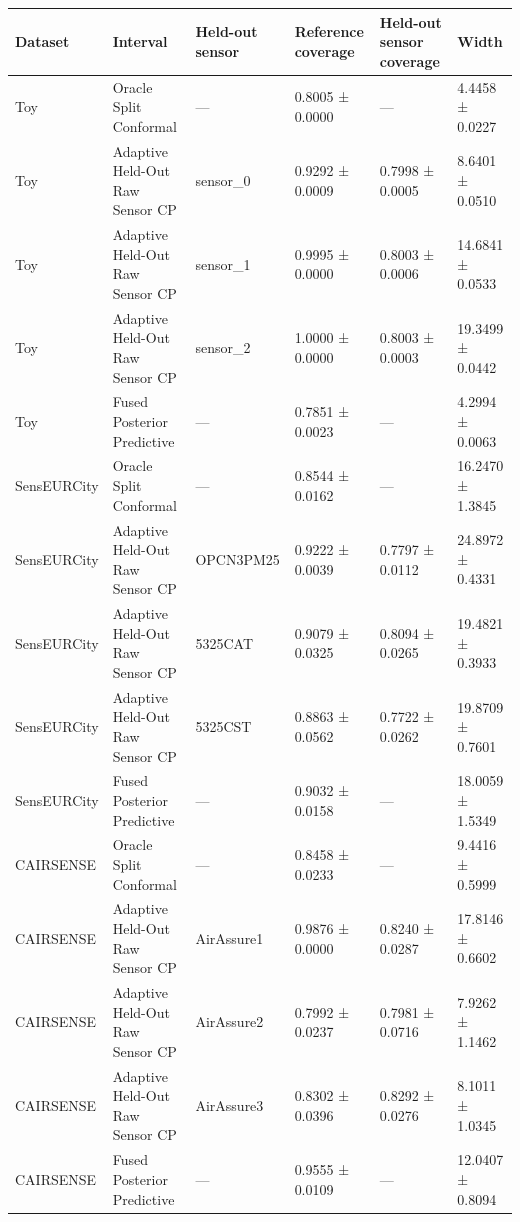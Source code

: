 \begin{tabular}{llllll}
\toprule
Dataset & Interval & Held-out sensor & Reference coverage & Held-out sensor coverage & Width \\
\midrule
Toy & Oracle Split Conformal & — & 0.8005 ± 0.0000 & — & 4.4458 ± 0.0227 \\
Toy & Adaptive Held-Out Raw Sensor CP & sensor\_0 & 0.9292 ± 0.0009 & 0.7998 ± 0.0005 & 8.6401 ± 0.0510 \\
Toy & Adaptive Held-Out Raw Sensor CP & sensor\_1 & 0.9995 ± 0.0000 & 0.8003 ± 0.0006 & 14.6841 ± 0.0533 \\
Toy & Adaptive Held-Out Raw Sensor CP & sensor\_2 & 1.0000 ± 0.0000 & 0.8003 ± 0.0003 & 19.3499 ± 0.0442 \\
Toy & Fused Posterior Predictive & — & 0.7851 ± 0.0023 & — & 4.2994 ± 0.0063 \\
SensEURCity & Oracle Split Conformal & — & 0.8544 ± 0.0162 & — & 16.2470 ± 1.3845 \\
SensEURCity & Adaptive Held-Out Raw Sensor CP & OPCN3PM25 & 0.9222 ± 0.0039 & 0.7797 ± 0.0112 & 24.8972 ± 0.4331 \\
SensEURCity & Adaptive Held-Out Raw Sensor CP & 5325CAT & 0.9079 ± 0.0325 & 0.8094 ± 0.0265 & 19.4821 ± 0.3933 \\
SensEURCity & Adaptive Held-Out Raw Sensor CP & 5325CST & 0.8863 ± 0.0562 & 0.7722 ± 0.0262 & 19.8709 ± 0.7601 \\
SensEURCity & Fused Posterior Predictive & — & 0.9032 ± 0.0158 & — & 18.0059 ± 1.5349 \\
CAIRSENSE & Oracle Split Conformal & — & 0.8458 ± 0.0233 & — & 9.4416 ± 0.5999 \\
CAIRSENSE & Adaptive Held-Out Raw Sensor CP & AirAssure1 & 0.9876 ± 0.0000 & 0.8240 ± 0.0287 & 17.8146 ± 0.6602 \\
CAIRSENSE & Adaptive Held-Out Raw Sensor CP & AirAssure2 & 0.7992 ± 0.0237 & 0.7981 ± 0.0716 & 7.9262 ± 1.1462 \\
CAIRSENSE & Adaptive Held-Out Raw Sensor CP & AirAssure3 & 0.8302 ± 0.0396 & 0.8292 ± 0.0276 & 8.1011 ± 1.0345 \\
CAIRSENSE & Fused Posterior Predictive & — & 0.9555 ± 0.0109 & — & 12.0407 ± 0.8094 \\
\bottomrule
\end{tabular}
